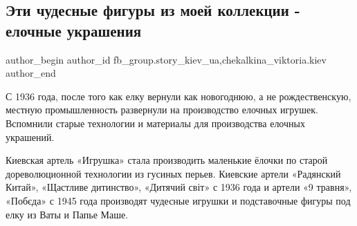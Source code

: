  
 
 
 
 
 
\subsection{Эти чудесные фигуры из моей коллекции - елочные украшения}
\label{sec:31_12_2021.fb.fb_group.story_kiev_ua.1.jolka_ukrashenia}
 
\ifcmt
 author_begin
   author_id fb_group.story_kiev_ua,chekalkina_viktoria.kiev
 author_end
\fi

С 1936 года, после того как елку вернули как новогоднюю, а не рождественскую,
местную промышленность развернули на производство елочных игрушек. Вспомнили
старые технологии и материалы для производства елочных украшений. 

\raggedcolumns
\begin{multicols}{2} %
\setlength{\parindent}{0pt}



\end{multicols} %


\raggedcolumns
\begin{multicols}{2} %
\setlength{\parindent}{0pt}


\end{multicols} %

Киевская артель «Игрушка» стала производить маленькие ёлочки по старой
дореволюционной технологии из гусиных перьев. Киевские артели «Радянский
Китай», «Щастливе дитинство», «Дитячий світ» с 1936 года и артели «9 травня»,
«Побєда» с 1945 года производят чудесные игрушки и подставочные фигуры под елку
из Ваты и Папье Маше.  

